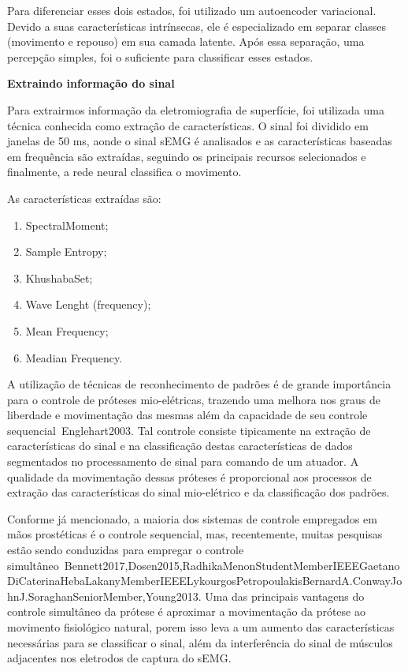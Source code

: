 \documentclass[a4paper, 12pt]{ppgeb}
\begin{document}
Para diferenciar esses dois estados, foi utilizado um autoencoder variacional. Devido a suas características intrínsecas, ele é especializado em separar classes (movimento e repouso) em sua camada latente. Após essa separação, uma percepção simples, foi o suficiente para classificar esses estados.

\textbf{Extraindo informação do sinal}

Para extrairmos informação da eletromiografia de superfície, foi utilizada uma técnica conhecida como extração de características. O sinal foi dividido em janelas de 50 ms, aonde o sinal sEMG é analisados e as características baseadas em frequência são extraídas, seguindo os principais recursos selecionados e finalmente, a rede neural classifica o movimento.

As características extraídas são:
\begin{enumerate}
\item SpectralMoment;
\item Sample Entropy;
\item KhushabaSet;
\item Wave Lenght (frequency);
\item Mean Frequency;
\item Meadian Frequency.
\end{enumerate}


A utilização de técnicas de reconhecimento de padrões é de grande importância para o controle de próteses mio-elétricas, trazendo uma melhora nos graus de liberdade e movimentação das mesmas além da capacidade de seu controle sequencial~\cite{resumoestendido}{Englehart2003}. Tal controle consiste tipicamente na extração de características do sinal e na classificação destas características de dados segmentados no processamento de sinal para comando de um atuador. A qualidade da movimentação dessas próteses é proporcional aos processos de extração das características do sinal mio-elétrico e da classificação dos padrões.

Conforme já mencionado, a maioria dos sistemas de controle empregados em mãos prostéticas é o controle sequencial, mas, recentemente, muitas pesquisas estão sendo conduzidas para empregar o controle simultâneo~\cite{resumoestendido}{Bennett2017,Dosen2015,RadhikaMenonStudentMemberIEEEGaetanoDiCaterinaHebaLakanyMemberIEEELykourgosPetropoulakisBernardA.ConwayJohnJ.SoraghanSeniorMember,Young2013}. Uma das principais vantagens do controle simultâneo da prótese é aproximar a movimentação da prótese ao movimento fisiológico natural, porem isso leva a um aumento das características necessárias para se classificar o sinal, além da interferência do sinal de músculos adjacentes nos eletrodos de captura do sEMG.
\end{document}
